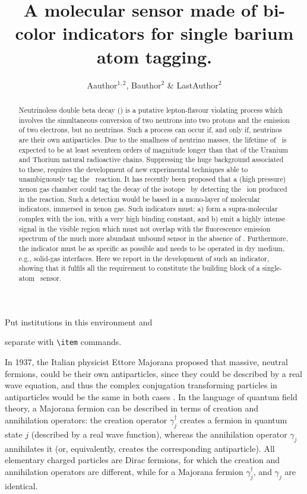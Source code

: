 \documentclass{nature}
\title{A molecular sensor made of bi-color indicators for single barium atom tagging.}
\author{Aauthor$^{1,2}$, Bauthor$^2$ \& LastAuthor$^2$}
\begin{document}
\maketitle

\begin{affiliations}
 \item Put institutions in this environment and
 \item separate with \verb|\item| commands.
\end{affiliations}

\begin{abstract}
Neutrinoless double beta decay (\bbonu) is a putative lepton-flavour violating process which involves the simultaneous conversion of two neutrons into two protons and the emission of two electrons, but no neutrinos. Such a process can occur if, and only if, neutrinos are their own antiparticles. Due to the smallness of neutrino masses, the lifetime of \bbonu\ is expected to be at least seventeen orders of magnitude longer than that of the Uranium and Thorium natural radioactive chains. Suppressing the huge background associated to these, requires the development of new experimental techniques able to unambiguously tag the \bbonu\ reaction. It has recently been proposed that a (high pressure) xenon gas chamber could tag the decay of the isotope \XE\ by detecting the \Bapp\ ion produced in the reaction.  Such a detection would be based in a mono-layer of molecular indicators, immersed in xenon gas. Such indicators must: a) form a supra-molecular complex with the ion, with a very high binding constant, and b) emit a highly intense signal in the visible region which must not overlap with the fluorescence emission spectrum of the much more abundant unbound sensor in the absence of  \Bapp. Furthermore, the indicator must be as specific as possible and needs to be operated in dry medium, e.g., solid-gas interfaces. Here we report in the development of such an indicator, showing that it fulfils all the requirement to constitute the building block of a single-atom \Bapp\ sensor. 
\end{abstract}

In 1937, the Italian physicist Ettore Majorana proposed that massive, neutral fermions, could be their own antiparticles, since they could be described by a real wave equation, and thus the complex conjugation transforming particles in antiparticles would be the same in both cases \cite{Majorana:1937vz}. In the language of quantum field theory, a Majorana fermion can be described in terms of creation and annihilation operators: the creation operator $\gamma_{j}^{\dagger }$ creates a fermion in quantum state $j$ (described by a real wave function), whereas the annihilation operator $\gamma_{j}$ annihilates it (or, equivalently, creates the corresponding antiparticle). All elementary charged particles are Dirac fermions, for which the creation and annihilation operators are different, while for a Majorana fermion $\gamma_{j}^{\dagger }$, and $\gamma_{j}$ are identical.  
\end{document}
